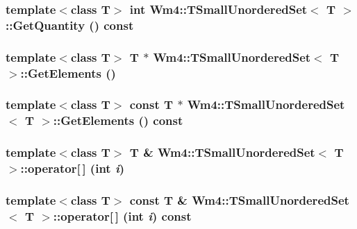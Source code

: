 \subsubsection{\setlength{\rightskip}{0pt plus 5cm}template$<$class T$>$ int {\bf Wm4::TSmall\-Unordered\-Set}$<$ T $>$::Get\-Quantity () const}\label{classWm4_1_1TSmallUnorderedSet_22646babffba340ed45d1a0823333616}


\subsubsection{\setlength{\rightskip}{0pt plus 5cm}template$<$class T$>$ T $\ast$ {\bf Wm4::TSmall\-Unordered\-Set}$<$ T $>$::Get\-Elements ()}\label{classWm4_1_1TSmallUnorderedSet_ac98e31842f3cdbe7331663d969bf969}


\subsubsection{\setlength{\rightskip}{0pt plus 5cm}template$<$class T$>$ const T $\ast$ {\bf Wm4::TSmall\-Unordered\-Set}$<$ T $>$::Get\-Elements () const}\label{classWm4_1_1TSmallUnorderedSet_ea47a8d4ea1f56c0b5be02648e5f2014}


\subsubsection{\setlength{\rightskip}{0pt plus 5cm}template$<$class T$>$ T \& {\bf Wm4::TSmall\-Unordered\-Set}$<$ T $>$::operator[$\,$] (int {\em i})}\label{classWm4_1_1TSmallUnorderedSet_9b16af01eac1f26d3e28e896d67cc1f3}


\subsubsection{\setlength{\rightskip}{0pt plus 5cm}template$<$class T$>$ const T \& {\bf Wm4::TSmall\-Unordered\-Set}$<$ T $>$::operator[$\,$] (int {\em i}) const}\label{classWm4_1_1TSmallUnorderedSet_c251450549fb315ae85b93ed12fceec0}


